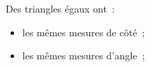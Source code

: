 Des triangles égaux ont~:
\begin{itemize}
    \item les mêmes mesures de côté~;
    \item les mêmes mesures d'angle~;
\end{itemize}